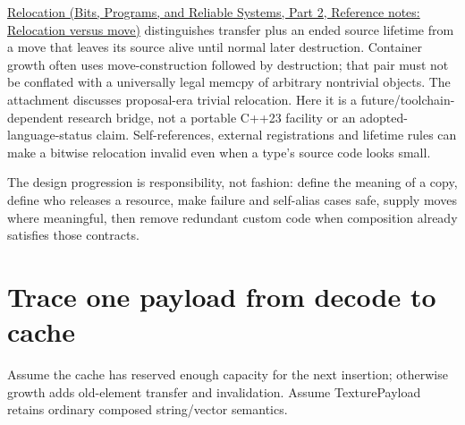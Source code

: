 \href{../01-Bits-Programs-and-Reliable-Systems-P02/main.pdf\#nameddest=appendix-adfd6397af8d}{Relocation (Bits, Programs, and Reliable Systems, Part 2, Reference notes: Relocation versus move)} distinguishes transfer plus an ended source lifetime from a move that leaves its source alive until normal later destruction. Container growth often uses move-construction followed by destruction; that pair must not be conflated with a universally legal memcpy of arbitrary nontrivial objects. The attachment discusses proposal-era trivial relocation. Here it is a future/toolchain-dependent research bridge, not a portable C++23 facility or an adopted-language-status claim. Self-references, external registrations and lifetime rules can make a bitwise relocation invalid even when a type's source code looks small.

The design progression is responsibility, not fashion: define the meaning of a copy, define who releases a resource, make failure and self-alias cases safe, supply moves where meaningful, then remove redundant custom code when composition already satisfies those contracts.

\section{Trace one payload from decode to cache}\label{05-engine-i-ch003-trace-one-payload-from-decode-to-cache}

\hypertarget{05-engine-i-ch003-trace-one-payload-from-decode-to-cache}{}

Assume the cache has reserved enough capacity for the next insertion; otherwise growth adds old-element transfer and invalidation. Assume TexturePayload retains ordinary composed string/vector semantics.

